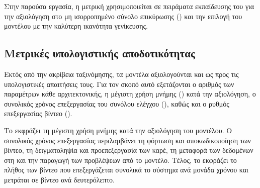 Στην παρούσα εργασία, η μετρική χρησιμοποιείται σε πειράματα εκπαίδευσης
του  για την αξιολόγηση στο μη ισορροπημένο 
σύνολο επικύρωσης () και την επιλογή του μοντέλου με την
καλύτερη ικανότητα γενίκευσης. 

\subsection{Μετρικές υπολογιστικής αποδοτικότητας}
\label{subsec:computational-efficiency}

Εκτός από την ακρίβεια ταξινόμησης, τα μοντέλα αξιολογούνται και ως προς
τις υπολογιστικές απαιτήσεις τους. Για τον σκοπό αυτό εξετάζονται ο αριθμός
των παραμέτρων κάθε αρχιτεκτονικής, η μέγιστη χρήση μνήμης 
() κατά την αξιολόγηση, ο συνολικός χρόνος επεξεργασίας του
συνόλου ελέγχου (), καθώς και ο ρυθμός
επεξεργασίας βίντεο ().

Το  εκφράζει τη μέγιστη χρήση μνήμης
 κατά την αξιολόγηση του μοντέλου. Ο συνολικός χρόνος επεξεργασίας
περιλαμβάνει τη φόρτωση και αποκωδικοποίηση των βίντεο, τη δειγματοληψία
και προεπεξεργασία των καρέ, τη μεταφορά των δεδομένων στη  και
την παραγωγή των προβλέψεων από το μοντέλο. Τέλος, το 
εκφράζει το πλήθος των βίντεο που επεξεργάζεται συνολικά το σύστημα ανά
μονάδα χρόνου και μετράται σε βίντεο ανά δευτερόλεπτο.
